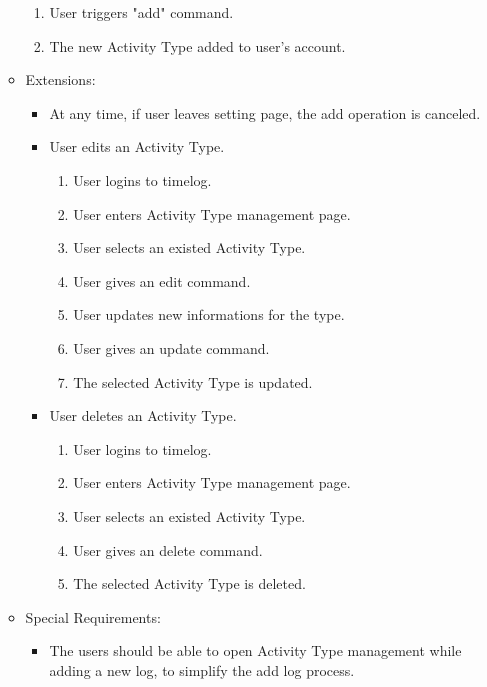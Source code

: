 \documentclass[12pt, a4paper]{article}
\begin{document}
\begin{CJK*}{UTF8}{bkai}
\begin{enumerate}
\begin{itemize}
\begin{enumerate}
              \item User triggers "add" command.
              \item The new Activity Type added to user's account.
            \end{enumerate}
          \item Extensions:
            \begin{itemize}
              \item At any time, if user leaves setting page, the add operation is canceled.
              \item User edits an Activity Type.
                \begin{enumerate}
                  \item User logins to timelog.
                  \item User enters Activity Type management page.
                  \item User selects an existed Activity Type.
                  \item User gives an edit command.
                  \item User updates new informations for the type.
                  \item User gives an update command.
                  \item The selected Activity Type is updated.
                \end{enumerate}
              \item User deletes an Activity Type.
                \begin{enumerate}
                  \item User logins to timelog.
                  \item User enters Activity Type management page.
                  \item User selects an existed Activity Type.
                  \item User gives an delete command.
                  \item The selected Activity Type is deleted.
                \end{enumerate}
            \end{itemize}
          \item Special Requirements:
            \begin{itemize}
              \item The users should be able to open Activity Type management while adding a new log, to simplify the add log process.
            \end{itemize}

\end{itemize}
\end{enumerate}
\end{CJK*}
\end{document}
